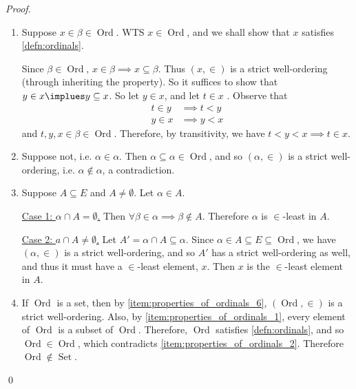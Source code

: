 \documentclass[notoc,notitlepage]{tufte-book}
\DeclareMathOperator{\Ord}{Ord }
\DeclareMathOperator{\Set}{Set }
\begin{document}
\begin{proof}
  \begin{enumerate}
    \item Suppose $x \in \beta \in \Ord$. WTS $x \in \Ord$, and we shall show that $x$ satisfies \cref{defn:ordinals}.

      Since $\beta \in \Ord, \, x \in \beta \implies x \subseteq \beta$. Thus $(x, \in)$ is a strict well-ordering (through inheriting the property). So it suffices to show that $y \in x \implues y \subseteq x$. So let $y \in x$, and let $t \in x$ . Observe that
      \begin{align*}
        t \in y &\implies t < y \\
        y \in x &\implies y < x
      \end{align*}
      and $t, y, x \in \beta \in \Ord$. Therefore, by transitivity, we have $t < y < x \implies t \in x$.

    \item Suppose not, i.e. $\alpha \in \alpha$. Then $\alpha \subseteq \alpha \in \Ord$, and so $(\alpha, \in)$ is a strict well-ordering, i.e. $\alpha \notin \alpha$, a contradiction.

    \setcounter{enumi}{5}
    \item Suppose $A \subseteq E$ and $A \neq \emptyset$. Let $\alpha \in A$.

      \noindent\underline{Case 1: $\alpha \cap A = \emptyset$.} Then $\forall \beta \in \alpha \implies \beta \notin A$. Therefore $\alpha$ is $\in$-least in $A$.

      \noindent\underline{Case 2: $a \cap A \neq \emptyset$.} Let $A' = \alpha \cap A \subseteq \alpha$. Since $\alpha \in A \subseteq E \subseteq \Ord$, we have $(\alpha, \in)$ is a strict well-ordering, and so $A'$ has a strict well-ordering as well, and thus it must have a $\in$-least element, $x$. Then $x$ is the $\in$-least element in $A$.

    \item If $\Ord$ is a set, then by \cref{item:properties_of_ordinals_6}, $(\Ord, \in)$ is a strict well-ordering. Also, by \cref{item:properties_of_ordinals_1}, every element of $\Ord$ is a subset of $\Ord$. Therefore, $\Ord$ satisfies \cref{defn:ordinals}, and so $\Ord \in \Ord$, which contradicts \cref{item:properties_of_ordinals_2}. Therefore $\Ord \notin \Set$.
  \end{enumerate}\qed
\end{proof}




\appendix

\backmatter

\pagestyle{plain}

\nobibliography*
% 

\printindex
\end{document}
